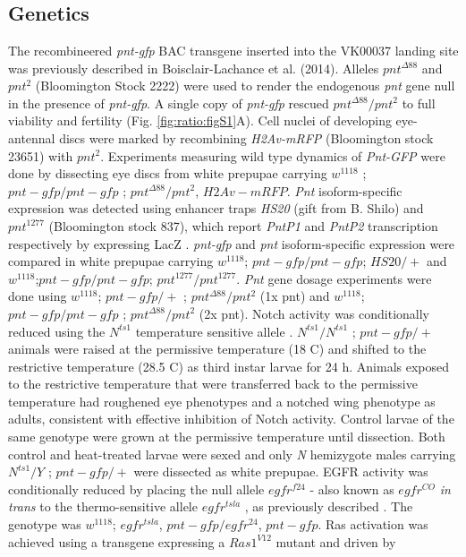 \graphicspath{ {./figures/ratio/} }

\section{}
\label{appendix:methods:ratio}


\subsection{Genetics}
\label{appendix:methods:ratio:genetics}

The recombineered \textit{pnt-gfp} BAC transgene inserted into the VK00037 landing site was previously described in Boisclair-Lachance et al. (2014). Alleles $pnt^{\Delta 88}$ \cite{ONeill1994a} and $pnt^2$ (Bloomington Stock 2222) were used to render the endogenous \textit{pnt} gene null in the presence of \textit{pnt-gfp}. A single copy of \textit{pnt-gfp} rescued $pnt^{\Delta 88}/pnt^2$ to full viability and fertility (Fig. \ref{fig:ratio:figS1}A). Cell nuclei of developing eye-antennal discs were marked by recombining \textit{H2Av-mRFP} (Bloomington stock 23651) with $pnt^2$. Experiments measuring wild type dynamics of \textit{Pnt-GFP} were done by dissecting eye discs from white prepupae carrying $w^{1118}$ ; $pnt-gfp / pnt-gfp$ ; $pnt^{\Delta 88}/pnt^2$, $H2Av-mRFP$. \textit{Pnt} isoform-specific expression was detected using enhancer traps \textit{HS20} (gift from B. Shilo) and $pnt^{1277}$ (Bloomington stock 837), which report \textit{PntP1} and \textit{PntP2} transcription respectively by expressing LacZ \cite{Scholz1993}. \textit{pnt-gfp} and \textit{pnt} isoform-specific expression were compared in white prepupae carrying $w^{1118}$; $pnt-gfp/pnt-gfp$; $HS20/+$ and $w^{1118}$;$pnt-gfp/pnt-gfp$; $pnt^{1277}/pnt^{1277}$. \textit{Pnt} gene dosage experiments were done using $w^{1118}$; $pnt-gfp/+$ ; $pnt^{\Delta 88}/pnt^2$ (1x pnt) and $w^{1118}$; $pnt-gfp/pnt-gfp$ ; $pnt^{\Delta 88}/pnt^2$ (2x pnt). Notch activity was conditionally reduced using the $N^{ts1}$ temperature sensitive allele \cite{Shellenbarger1975}. $N^{ts1}/N^{ts1}$ ; $pnt-gfp/+$ animals were raised at the permissive temperature (18 \textdegree{}C) and shifted to the restrictive temperature (28.5 \textdegree{}C) as third instar larvae for 24 h. Animals exposed to the restrictive temperature that were transferred back to the permissive temperature had roughened eye phenotypes and a notched wing phenotype as adults, consistent with effective inhibition of Notch activity. Control larvae of the same genotype were grown at the permissive temperature until dissection. Both control and heat-treated larvae were sexed and only \textit{N} hemizygote males carrying $N^{ts1}/Y$ ; $pnt-gfp/+$ were dissected as white prepupae. EGFR activity was conditionally reduced by placing the null allele $egfr^{f24}$ - also known as $egfr^{CO}$ \cite{Clifford1989} \textit{in trans} to the thermo-sensitive allele $egfr^{tsla}$ \cite{Kumar1998}, as previously described \cite{Pelaez2015a}. The genotype was $w^{1118}$; $egfr^{tsla}$, $pnt-gfp/egfr^{24}$, $pnt-gfp$. Ras activation was achieved using a transgene expressing a $Ras1^{V12}$ mutant and driven by 